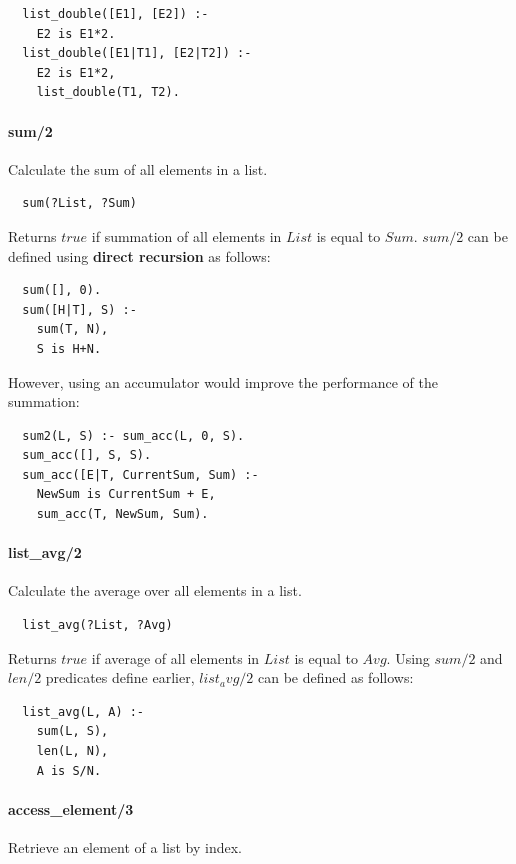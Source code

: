 \documentclass{article}
\begin{document}
\begin{multicols}{2}
  \begin{lstlisting}
  list_double([E1], [E2]) :-
    E2 is E1*2.
  list_double([E1|T1], [E2|T2]) :-
    E2 is E1*2,
    list_double(T1, T2).
  \end{lstlisting} 
  
  \paragraph{sum/2} Calculate the sum of all elements in a list.
  
  \begin{lstlisting}
  sum(?List, ?Sum)
  \end{lstlisting} 
  
  Returns $true$ if summation of all elements in $List$ is equal to $Sum$. $sum/2$ can be defined using {\bf direct recursion} as follows:

  \begin{lstlisting}
  sum([], 0).
  sum([H|T], S) :-
    sum(T, N),
    S is H+N.
  \end{lstlisting} 
  
  However, using an accumulator would improve the performance of the summation:
  
  \begin{lstlisting}
  sum2(L, S) :- sum_acc(L, 0, S).
  sum_acc([], S, S).
  sum_acc([E|T, CurrentSum, Sum) :-
    NewSum is CurrentSum + E,
    sum_acc(T, NewSum, Sum).
  \end{lstlisting} 
  
  \paragraph{list\_avg/2} Calculate the average over all elements in a list.
  
  \begin{lstlisting}
  list_avg(?List, ?Avg)
  \end{lstlisting} 
  
  Returns $true$ if average of all elements in $List$ is equal to $Avg$. Using $sum/2$ and $len/2$ predicates define earlier, $list_avg/2$ can be defined as follows:

  \begin{lstlisting}
  list_avg(L, A) :-
    sum(L, S),
    len(L, N),
    A is S/N.
  \end{lstlisting}
 
  \paragraph{access\_element/3} Retrieve an element of a list by index.
  

\end{multicols}
\end{document}
